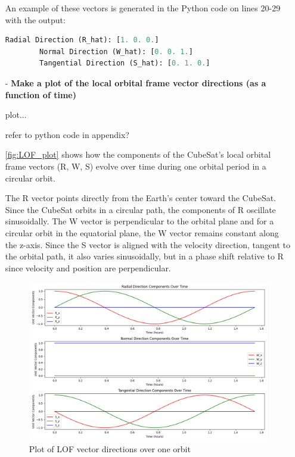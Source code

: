 \begin{itemize}
    An example of these vectors is generated in the Python code on lines 20-29 with the output:
    \begin{lstlisting}[frame=single, language=Python]
        Radial Direction (R_hat): [1. 0. 0.]
        Normal Direction (W_hat): [0. 0. 1.]
        Tangential Direction (S_hat): [0. 1. 0.]
    \end{lstlisting}

    
    
    \item[-] \textbf{Make a plot of the local orbital frame vector directions (as a function of time)}

    plot...

    refer to python code in appendix?

    \autoref{fig:LOF_plot} shows how the components of the CubeSat's local orbital frame vectors (R, W, S) evolve over time during one orbital period in a circular orbit.

    The R vector points directly from the Earth’s center toward the CubeSat.
    Since the CubeSat orbits in a circular path, the components of R oscillate sinusoidally.     
    The W vector is perpendicular to the orbital plane and for a circular orbit in the equatorial plane, the W vector remains constant along the z-axis.    
    Since the S vector is aligned with the velocity direction, tangent to the orbital path, it also varies sinusoidally, but in a phase shift relative to R since velocity and position are perpendicular.

    \begin{figure}[h]
        \centering
        \includegraphics[width=\linewidth]{Doc/Graphics/LOF_vector_directions_plot.png}
        \caption{Plot of LOF vector directions over one orbit}
        \label{fig:LOF_plot}
    \end{figure}
\end{itemize}
